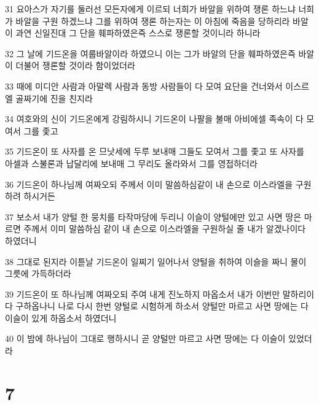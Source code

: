 \par 31 요아스가 자기를 둘러선 모든자에게 이르되 너희가 바알을 위하여 쟁론 하느냐 너희가 바알을 구원 하겠느냐 그를 위하여 쟁론 하는자는 이 아침에 죽음을 당하리라 바알이 과연 신일진대 그 단을 훼파하였은즉 스스로 쟁론할 것이니라 하니라
\par 32 그 날에 기드온을 여룹바알이라 하였으니 이는 그가 바알의 단을 훼파하였은즉 바알이 더불어 쟁론할 것이라 함이었더라
\par 33 때에 미디안 사람과 아말렉 사람과 동방 사람들이 다 모여 요단을 건너와서 이스르엘 골짜기에 진을 친지라
\par 34 여호와의 신이 기드온에게 강림하시니 기드온이 나팔을 불매 아비에셀 족속이 다 모여서 그를 좇고
\par 35 기드온이 또 사자를 온 므낫세에 두루 보내매 그들도 모여서 그를 좇고 또 사자를 아셀과 스불론과 납달리에 보내매 그 무리도 올라와서 그를 영접하더라
\par 36 기드온이 하나님께 여짜오되 주께서 이미 말씀하심같이 내 손으로 이스라엘을 구원하려 하시거든
\par 37 보소서 내가 양털 한 뭉치를 타작마당에 두리니 이슬이 양털에만 있고 사면 땅은 마르면 주께서 이미 말씀하심 같이 내 손으로 이스라엘을 구원하실 줄 내가 알겠나이다 하였더니
\par 38 그대로 된지라 이튿날 기드온이 일찌기 일어나서 양털을 취하여 이슬을 짜니 물이 그릇에 가득하더라
\par 39 기드온이 또 하나님께 여짜오되 주여 내게 진노하지 마옵소서 내가 이번만 말하리이다 구하옵나니 나로 다시 한번 양털로 시험하게 하소서 양털만 마르고 사면 땅에는 다 이슬이 있게 하옵소서 하였더니
\par 40 이 밤에 하나님이 그대로 행하시니 곧 양털만 마르고 사면 땅에는 다 이슬이 있었더라

\chapter{7}

